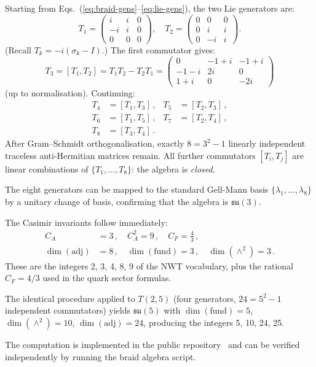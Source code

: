 \documentclass[11pt]{article}
\newcommand{\su}{\mathfrak{su}}
\newcommand{\CA}{C_A}
\newcommand{\CF}{C_F}
\begin{document}
Starting from Eqs.~(\ref{eq:braid-gens}--\ref{eq:lie-gens}), the
two Lie generators are:
\[
T_1 = \begin{pmatrix}
  i & i & 0 \\ -i & i & 0 \\ 0 & 0 & 0
\end{pmatrix}\!,\quad
T_2 = \begin{pmatrix}
  0 & 0 & 0 \\ 0 & i & i \\ 0 & -i & i
\end{pmatrix}\!.
\]
(Recall $T_k = -i(\sigma_k - I)$.)  The first commutator gives:
\[
T_3 = [T_1, T_2] = T_1 T_2 - T_2 T_1
= \begin{pmatrix}
  0 & -1+i & -1+i \\
  -1-i & 2i & 0 \\
  1+i & 0 & -2i
\end{pmatrix}\!
\]
(up to normalisation).  Continuing:
\begin{align*}
T_4 &= [T_1, T_3]\,, &
T_5 &= [T_2, T_3]\,, \\
T_6 &= [T_1, T_5]\,, &
T_7 &= [T_2, T_4]\,, \\
T_8 &= [T_3, T_4]\,.
\end{align*}
After Gram--Schmidt orthogonalisation, exactly $8 = 3^2 - 1$
linearly independent traceless anti-Hermitian matrices remain.
All further commutators $[T_i, T_j]$ are linear combinations of
$\{T_1, \ldots, T_8\}$: the algebra is \emph{closed}.

The eight generators can be mapped to the standard Gell-Mann
basis $\{\lambda_1, \ldots, \lambda_8\}$ by a unitary change of
basis, confirming that the algebra is $\su(3)$.

The Casimir invariants follow immediately:
\begin{align*}
\CA &= 3\,,\quad \CA^2 = 9\,,\quad
\CF = \tfrac{4}{3}\,,\\
\dim(\mathrm{adj}) &= 8\,,\quad
\dim(\mathrm{fund}) = 3\,,\quad
\dim(\wedge^2) = 3\,.
\end{align*}
These are the integers 2, 3, 4, 8, 9 of the NWT vocabulary,
plus the rational $C_F = 4/3$ used in the quark sector formulas.

The identical procedure applied to $T(2,5)$ (four generators,
$24 = 5^2-1$ independent commutators) yields $\su(5)$ with
$\dim(\mathrm{fund}) = 5$, $\dim(\wedge^2) = 10$,
$\dim(\mathrm{adj}) = 24$, producing the integers 5, 10, 24, 25.

The computation is implemented in the public
repository~\cite{public-repo} and can be verified independently
by running the braid algebra script.
\end{document}
